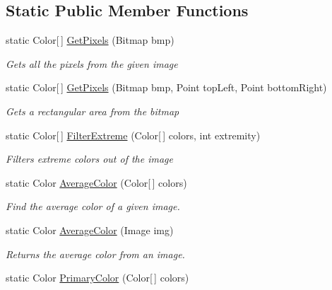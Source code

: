 \subsection*{Static Public Member Functions}
\begin{DoxyCompactItemize}
\item 
static Color\mbox{[}$\,$\mbox{]} \hyperlink{classHumDrum_1_1Operations_1_1ImageManager_a918b31c803ee0c7ebfeafe323e66e95c}{Get\+Pixels} (Bitmap bmp)
\begin{DoxyCompactList}\small\item\em Gets all the pixels from the given image \end{DoxyCompactList}\item 
static Color\mbox{[}$\,$\mbox{]} \hyperlink{classHumDrum_1_1Operations_1_1ImageManager_a68e46676dbe79e7f14d2fc5e43a2be0d}{Get\+Pixels} (Bitmap bmp, Point top\+Left, Point bottom\+Right)
\begin{DoxyCompactList}\small\item\em Gets a rectangular area from the bitmap \end{DoxyCompactList}\item 
static Color\mbox{[}$\,$\mbox{]} \hyperlink{classHumDrum_1_1Operations_1_1ImageManager_af339e23459fff24820e69b52808e9cf6}{Filter\+Extreme} (Color\mbox{[}$\,$\mbox{]} colors, int extremity)
\begin{DoxyCompactList}\small\item\em Filters extreme colors out of the image \end{DoxyCompactList}\item 
static Color \hyperlink{classHumDrum_1_1Operations_1_1ImageManager_acc049a42a381e38d274ff9ffb1388970}{Average\+Color} (Color\mbox{[}$\,$\mbox{]} colors)
\begin{DoxyCompactList}\small\item\em Find the average color of a given image. \end{DoxyCompactList}\item 
static Color \hyperlink{classHumDrum_1_1Operations_1_1ImageManager_ac32a96f19e365c486d75d1f8a290fd51}{Average\+Color} (Image img)
\begin{DoxyCompactList}\small\item\em Returns the average color from an image. \end{DoxyCompactList}\item 
static Color \hyperlink{classHumDrum_1_1Operations_1_1ImageManager_af0d994500d18285e997d40414e7d3c3b}{Primary\+Color} (Color\mbox{[}$\,$\mbox{]} colors)

\end{DoxyCompactItemize}
